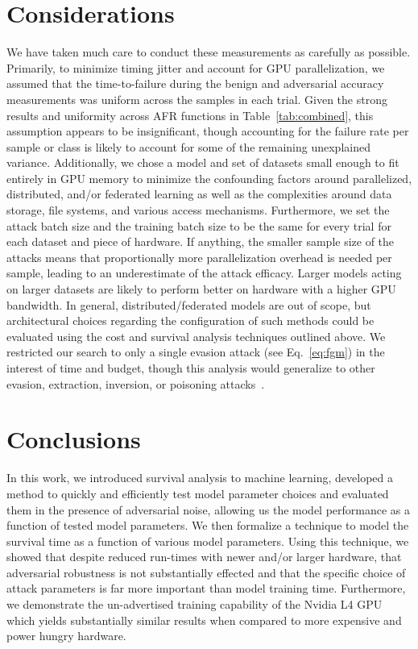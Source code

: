 \documentclass[journal]{IEEEtran}
\begin{document}
\section{Considerations}
\label{considerations}
We have taken much care to conduct these measurements as carefully as possible.
Primarily, to minimize timing jitter and account for GPU parallelization, we assumed that the time-to-failure during the benign and adversarial accuracy measurements was uniform across the samples in each trial. 
Given the strong results and uniformity across AFR functions in Table~\ref{tab:combined}, this assumption appears to be insignificant, though accounting for the failure rate per sample or class is likely to account for some of the remaining unexplained variance. Additionally, we chose a model and set of datasets small enough to fit entirely in GPU memory to minimize the confounding factors around parallelized, distributed, and/or federated learning as well as the complexities around data storage, file systems, and various access mechanisms. 
Furthermore, we set the attack batch size and the training batch size to be the same for every trial for each dataset and piece of hardware.
If anything, the smaller sample size of the attacks means that proportionally more parallelization overhead is needed per sample, leading to an underestimate of the attack efficacy.
Larger models acting on larger datasets are likely to perform better on hardware with a higher GPU bandwidth. 
In general, distributed/federated models are out of scope, but architectural choices regarding the configuration of such methods could be evaluated using the cost and survival analysis techniques outlined above. 
We restricted our search to only a single evasion attack (see Eq.~\ref{eq:fgm}) in the interest of time and budget, though this analysis would generalize to other evasion, extraction, inversion, or poisoning attacks~\cite{biggio_evasion_2013,biggio_poisoning_2013,choquette2021label,orekondy2019knockoff}.

\section{Conclusions}
\label{conclusion}
In this work, we introduced survival analysis to machine learning, developed a method to quickly and efficiently test model parameter choices and evaluated them in the presence of adversarial noise, allowing us the model performance as a function of tested model parameters. We then formalize a technique to model the survival time as a function of various model parameters. 
Using this technique, we showed that despite reduced run-times with newer and/or larger hardware, that adversarial robustness is not substantially effected and that the specific choice of attack parameters is far more important than model training time. 
Furthermore, we demonstrate the un-advertised training capability of the Nvidia L4 GPU which yields substantially similar results when compared to more expensive and power hungry hardware. 
\end{document}
